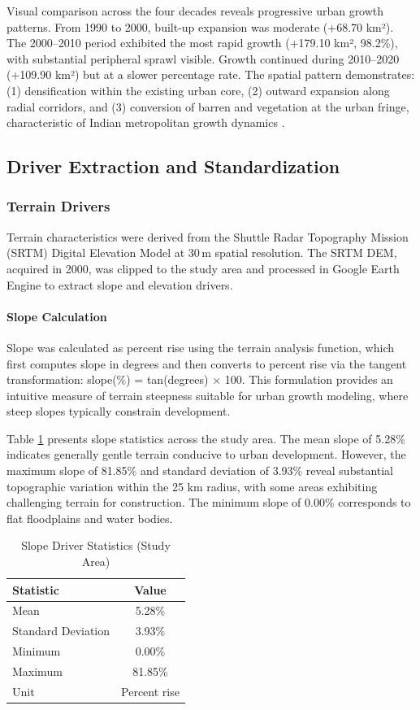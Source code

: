 \documentclass[12pt,a4paper]{article}
\begin{document}
Visual comparison across the four decades reveals progressive urban growth patterns. From 1990 to 2000, built-up expansion was moderate (+68.70 km²). The 2000--2010 period exhibited the most rapid growth (+179.10 km², 98.2\%), with substantial peripheral sprawl visible. Growth continued during 2010--2020 (+109.90 km²) but at a slower percentage rate. The spatial pattern demonstrates: (1) densification within the existing urban core, (2) outward expansion along radial corridors, and (3) conversion of barren and vegetation at the urban fringe, characteristic of Indian metropolitan growth dynamics \cite{mondal2016}.
\subsection{Driver Extraction and Standardization}

\subsubsection{Terrain Drivers}

Terrain characteristics were derived from the Shuttle Radar Topography Mission (SRTM) Digital Elevation Model \cite{farr2007} at 30\,m spatial resolution. The SRTM DEM, acquired in 2000, was clipped to the study area and processed in Google Earth Engine to extract slope and elevation drivers.

\paragraph{Slope Calculation}
Slope was calculated as percent rise using the terrain analysis function, which first computes slope in degrees and then converts to percent rise via the tangent transformation: slope(\%) = tan(degrees) $\times$ 100. This formulation provides an intuitive measure of terrain steepness suitable for urban growth modeling, where steep slopes typically constrain development.

Table \ref{tab:slope_stats} presents slope statistics across the study area. The mean slope of 5.28\% indicates generally gentle terrain conducive to urban development. However, the maximum slope of 81.85\% and standard deviation of 3.93\% reveal substantial topographic variation within the 25 km radius, with some areas exhibiting challenging terrain for construction. The minimum slope of 0.00\% corresponds to flat floodplains and water bodies.

\begin{table}[H]
\caption{Slope Driver Statistics (Study Area)}
\label{tab:slope_stats}
\centering
\small
\begin{tabular}{lc}
\toprule
\textbf{Statistic} & \textbf{Value} \\
\midrule
Mean & 5.28\% \\
Standard Deviation & 3.93\% \\
Minimum & 0.00\% \\
Maximum & 81.85\% \\
Unit & Percent rise \\
\bottomrule
\end{tabular}
\end{table}
\end{document}
